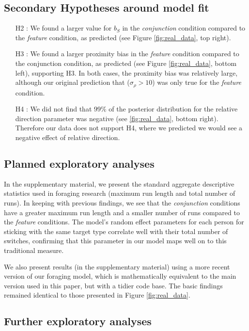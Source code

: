 \documentclass[12pt]{article}
\begin{document}
\subsection{Secondary Hypotheses around model fit}


\begin{enumerate}
    \item [H2]: We found a larger value for $b_S$ in the \textit{conjunction} condition compared to the \textit{feature} condition, as predicted (see Figure \ref{fig:real_data}, top right).
    \item [H3]: We found a larger proximity bias in the  \textit{feature} condition compared to the conjunction condition, as predicted (see Figure \ref{fig:real_data}, bottom left), supporting H3. In both cases, the proximity bias was relatively large, although our original prediction that ($\sigma_{\rho}>10$) was only true for the \textit{feature} condition.
    \item [H4]: We did not find that $99\%$ of the posterior distribution for the relative direction parameter was negative (see \ref{fig:real_data}, bottom right). Therefore our data does not support H4, where we predicted we would see a negative effect of relative direction.
\end{enumerate}

\subsection{Planned exploratory analyses}

In the supplementary material, we present the standard aggregate descriptive statistics used in foraging research (maximum run length and total number of runs). In keeping with previous findings, we see that the \textit{conjunction} conditions have a greater maximum run length and a smaller number of runs compared to the \textit{feature} conditions. The model's random effect parameters for each person for sticking with the same target type correlate well with their total number of switches, confirming that this parameter in our model maps well on to this traditional measure.

We also present results (in the supplementary material) using a more recent version of our foraging model, which is mathematically equivalent to the main version used in this paper, but with a tidier code base. The basic findings remained identical to those presented in Figure \ref{fig:real_data}.

\subsection{Further exploratory analyses}
\end{document}
